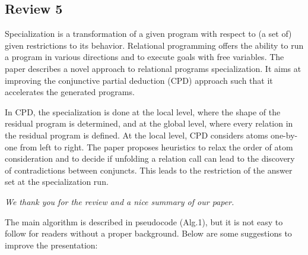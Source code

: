 
\subsection*{Review 5}

Specialization is a transformation of a given program with respect to (a set of) given restrictions to its behavior. Relational programming offers the ability to run a program in various directions and to execute goals with free variables. The paper describes a novel approach to relational programs specialization. It aims at improving the conjunctive partial deduction (CPD) approach such that it accelerates the generated programs.

In CPD, the specialization is done at the local level, where the shape of the residual program is determined, and at the global level, where every relation in the residual program is defined. At the local level, CPD considers atoms one-by-one from left to right. The paper proposes heuristics to relax the order of atom consideration and to decide if unfolding a relation call can lead to the discovery of contradictions between conjuncts. This leads to the restriction of the answer set at the specialization run.

\emph{We thank you for the review and a nice summary of our paper.}

The main algorithm is described in pseudocode (Alg.1), but it is not easy to follow for readers without a proper background. Below are some suggestions to improve the presentation:

